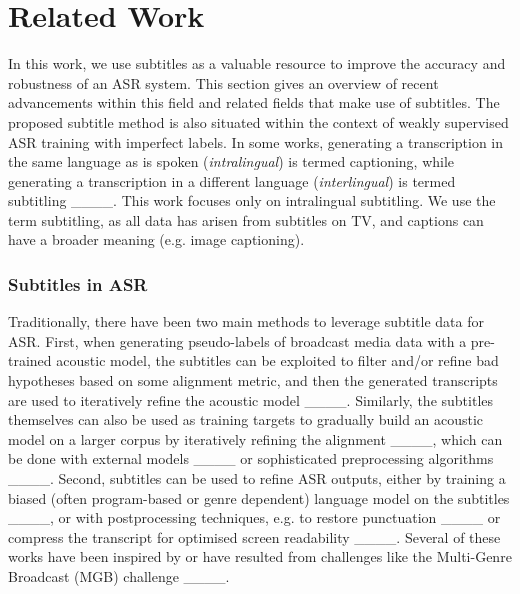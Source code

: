 \section{Related Work}
\label{sec:relatedwork}
\noindent In this work, we use subtitles as a valuable resource to improve the accuracy and robustness of an ASR system. This section gives an overview of recent advancements within this field and related fields that make use of subtitles. The proposed subtitle method is also situated within the context of weakly supervised ASR training with imperfect labels. In some works, generating a transcription in the same language as is spoken (\textit{intralingual}) is termed captioning, while generating a transcription in a different language (\textit{interlingual}) is termed subtitling ____. This work focuses only on intralingual subtitling. We use the term subtitling, as all data has arisen from subtitles on TV, and captions can have a broader meaning (e.g. image captioning).

\subsubsection{Subtitles in ASR}
\noindent Traditionally, there have been two main methods to leverage subtitle data for ASR. First, when generating pseudo-labels of broadcast media data with a pre-trained acoustic model, the subtitles can be exploited to filter and/or refine bad hypotheses based on some alignment metric, and then the generated transcripts are used to iteratively refine the acoustic model ____. Similarly, the subtitles themselves can also be used as training targets to gradually build an acoustic model on a larger corpus by iteratively refining the alignment ____, which can be done with external models ____ or sophisticated preprocessing algorithms ____. Second, subtitles can be used to refine ASR outputs, either by training a biased (often program-based or genre dependent) language model on the subtitles ____, or with postprocessing techniques, e.g. to restore punctuation ____ or compress the transcript for optimised screen readability ____. Several of these works have been inspired by or have resulted from challenges like the Multi-Genre Broadcast (MGB) challenge ____.

